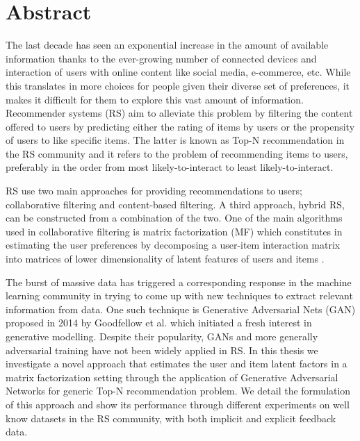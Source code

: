 \newpage
\chapter*{Abstract}


The last decade has seen an exponential increase in the amount of available information thanks to the ever-growing number of connected devices and interaction of users with online content like social media, e-commerce, etc. While this translates in more choices for people given their diverse set of preferences, it makes it difficult for them to explore this vast amount of information. Recommender systems (RS) aim to alleviate this problem by filtering the content offered to users by predicting either the rating of items by users or the propensity of users to like specific items. The latter is known as Top-N recommendation in the RS community and it refers to the problem of recommending items to users, preferably in the order from most likely-to-interact to least likely-to-interact.

RS use two main approaches for providing recommendations to users; collaborative filtering and content-based filtering. A third approach, hybrid RS, can be constructed from a combination of the two. One of the main algorithms used in collaborative filtering is matrix factorization (MF) which constitutes in estimating the user preferences by decomposing a user-item interaction matrix into matrices of lower dimensionality of latent features of users and items \cite{koren2009matrix}.

The burst of massive data has triggered a corresponding response in the machine learning community in trying to come up with new techniques to extract relevant information from data. One such technique is Generative Adversarial Nets \cite{goodfellow2014generative} (GAN) proposed in 2014 by Goodfellow et al. which initiated a fresh interest in generative modelling. Despite their popularity, GANs and more generally adversarial training have not been widely applied in RS.
In this thesis we investigate a novel approach that estimates the user and item latent factors in a matrix factorization setting through the application of Generative Adversarial Networks for generic Top-N recommendation problem. We detail the formulation of this approach and show its performance through different experiments on well know datasets in the RS community, with both implicit and explicit feedback data.